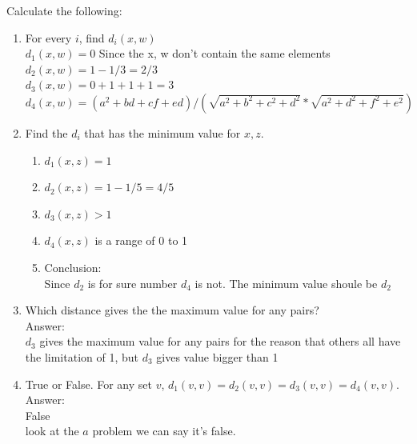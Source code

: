 \documentclass{article}
\begin{document}
\begin{enumerate}
Calculate the following:
\begin{enumerate} \item For every $i$, find $d_i(x,w)$\\
	$d_1(x, w) = 0 $ Since the x, w don't contain the same elements\\
	$d_2(x, w) = 1- 1/ 3 = 2/3$\\
	$d_3(x, w) = 0 + 1 + 1 + 1 = 3$\\
	$d_4(x, w) = (a^2 + bd + cf + ed) / (\sqrt{a^2 + b^2 + c^2 + d^2} * \sqrt{a^2 + d^2 + f^2 + e^2})$
	 \item Find the $d_i$ that has the minimum value for $x,z$.\\
	 \begin{enumerate}
	 	\item $d_1(x,z) = 1$
	 	\item $d_2(x,z) = 1 - 1/5 = 4 /5$
	 	\item $d_3(x,z) > 1$
	 	\item $d_4(x,z)$ is a range of 0 to 1
	 	\item Conclusion:\\
	 	Since $d_2$ is for sure number $d_4$ is not. The minimum value shoule be $d_2$
	 \end{enumerate}
	   \item Which distance gives the the maximum value for any pairs? \\
	   Answer:\\
	   $d_3$ gives the maximum value for any pairs for the reason that others all have the limitation of 1, but $d_3$ gives value bigger than 1
	    \item \textsf{True or False}.  For any set $v$, $d_1(v,v) = d_2(v,v) = d_3(v,v) = d_4(v,v)$.\\
	    Answer:\\
	    False\\
	    look at the \(a\) problem we can say it's false.
	     \end{enumerate}


\end{enumerate}
\end{document}
